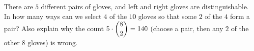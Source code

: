 There are $5$ different pairs of gloves, and left and right gloves are distinguishable. In how many ways can we select $4$ of the $10$ gloves so that some $2$ of the $4$ form a pair? Also explain why the count $5\cdot\dbinom82=140$ (choose a pair, then any $2$ of the other $8$ gloves) is wrong.
